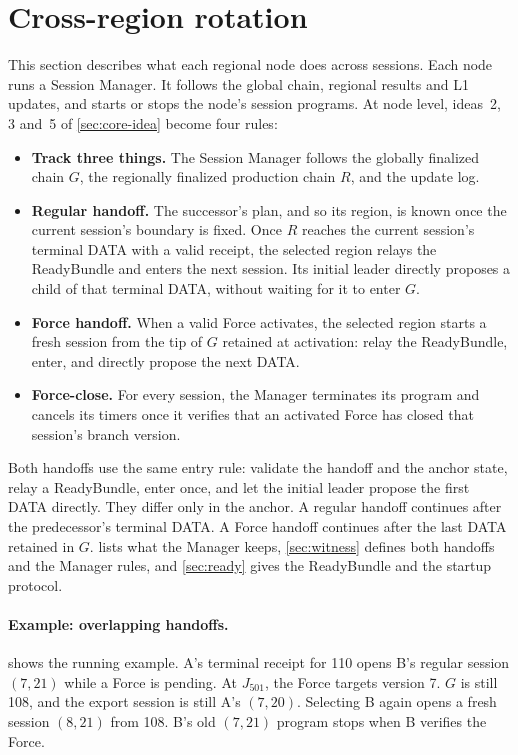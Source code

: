 \documentclass[11pt,a4paper]{article}
\newcounter{protocol}
\begin{document}
\section{Cross-region rotation}
\label{sec:xprotocols}
This section describes what each regional node does across sessions.
Each node runs a Session Manager. It follows the global chain, regional
results and L1 updates, and starts or stops the node's session programs.
At node level, ideas~2, 3 and~5 of
\cref{sec:core-idea} become four rules:
\begin{itemize}[itemsep=2pt]
\item \textbf{Track three things.} The Session Manager follows the
globally finalized chain $G$, the regionally finalized production chain
$R$, and the update log.
\item \textbf{Regular handoff.} The successor's plan, and so its region,
is known once the current session's boundary is fixed. Once $R$ reaches
the current session's terminal DATA with a valid receipt, the selected
region relays the ReadyBundle and enters the next session. Its initial
leader directly proposes a child of that terminal DATA, without waiting
for it to enter $G$.
\item \textbf{Force handoff.} When a valid Force activates, the selected
region starts a fresh session from the tip of $G$ retained at activation:
relay the ReadyBundle, enter, and directly propose the next DATA.
\item \textbf{Force-close.} For every session, the Manager terminates its
program and cancels its timers once it verifies that an activated Force
has closed that session's branch version.
\end{itemize}
Both handoffs use the same entry rule: validate the handoff and the
anchor state, relay a ReadyBundle, enter once, and let the initial leader
propose the first DATA directly. They differ only in the anchor. A
regular handoff continues after the predecessor's terminal DATA. A Force
handoff continues after the last DATA retained in $G$.
 lists what the Manager keeps,
\cref{sec:witness} defines both handoffs and the Manager rules, and
\cref{sec:ready} gives the ReadyBundle and the startup protocol.

\paragraph{Example: overlapping handoffs.}
 shows the running example. A's terminal
receipt for 110 opens B's regular session $(7,21)$ while a Force is
pending. At $J_{501}$, the Force targets version 7. $G$ is still 108, and
the export session is still A's $(7,20)$. Selecting B again opens a fresh
session $(8,21)$ from 108. B's old $(7,21)$ program stops when B
verifies the Force.
\end{document}
